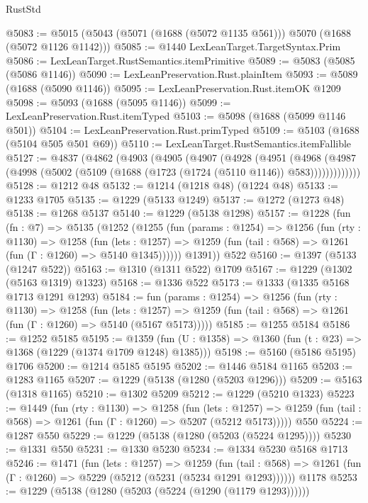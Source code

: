 \begin{lexlean}{RustStd}
\begin{coremodule}
@5083 := @5015 (@5043 (@5071 (@1688 (@5072 @1135 @561))) @5070 (@1688 (@5072 @1126 @1142)))
@5085 := @1440 LexLeanTarget.TargetSyntax.Prim
@5086 := LexLeanTarget.RustSemantics.itemPrimitive
@5089 := @5083 (@5085 (@5086 @1146))
@5090 := LexLeanPreservation.Rust.plainItem
@5093 := @5089 (@1688 (@5090 @1146))
@5095 := LexLeanPreservation.Rust.itemOK @1209
@5098 := @5093 (@1688 (@5095 @1146))
@5099 := LexLeanPreservation.Rust.itemTyped
@5103 := @5098 (@1688 (@5099 @1146 @501))
@5104 := LexLeanPreservation.Rust.primTyped
@5109 := @5103 (@1688 (@5104 @505 @501 @69))
@5110 := LexLeanTarget.RustSemantics.itemFallible
@5127 := @4837
    (@4862
      (@4903
        (@4905
          (@4907
            (@4928
              (@4951
                (@4968
                  (@4987 (@4998 (@5002 (@5109 (@1688 (@1723 (@1724 (@5110 @1146)) @583)))))))))))))
@5128 := @1212 @48
@5132 := @1214 (@1218 @48) (@1224 @48)
@5133 := @1233 @1705
@5135 := @1229 (@5133 @1249)
@5137 := @1272 (@1273 @48)
@5138 := @1268 @5137
@5140 := @1229 (@5138 @1298)
@5157 := @1228
    (fun (fn : @7) =>
    @5135
      (@1252
        (@1255
          (fun (params : @1254) =>
          @1256
            (fun (rty : @1130) =>
            @1258
              (fun (lets : @1257) =>
              @1259 (fun (tail : @568) => @1261 (fun (Γ : @1260) => @5140 @1345))))))
        @1391))
    @522
@5160 := @1397 (@5133 (@1247 @522))
@5163 := @1310 (@1311 @522) @1709
@5167 := @1229 (@1302 (@5163 @1319) @1323)
@5168 := @1336 @522
@5173 := @1333 (@1335 @5168 @1713 @1291 @1293)
@5184 := fun (params : @1254) =>
  @1256
    (fun (rty : @1130) =>
    @1258
      (fun (lets : @1257) =>
      @1259 (fun (tail : @568) => @1261 (fun (Γ : @1260) => @5140 (@5167 @5173)))))
@5185 := @1255 @5184
@5186 := @1252 @5185
@5195 := @1359 (fun (U : @1358) => @1360 (fun (t : @23) => @1368 (@1229 (@1374 @1709 @1248) @1385)))
@5198 := @5160 (@5186 @5195) @1706
@5200 := @1214 @5185 @5195
@5202 := @1446 @5184 @1165
@5203 := @1283 @1165
@5207 := @1229 (@5138 (@1280 (@5203 @1296)))
@5209 := @5163 (@1318 @1165)
@5210 := @1302 @5209
@5212 := @1229 (@5210 @1323)
@5223 := @1449
    (fun (rty : @1130) =>
    @1258
      (fun (lets : @1257) =>
      @1259 (fun (tail : @568) => @1261 (fun (Γ : @1260) => @5207 (@5212 @5173)))))
    @550
@5224 := @1287 @550
@5229 := @1229 (@5138 (@1280 (@5203 (@5224 @1295))))
@5230 := @1331 @550
@5231 := @1330 @5230
@5234 := @1334 @5230 @5168 @1713
@5246 := @1471
    (fun (lets : @1257) =>
    @1259
      (fun (tail : @568) => @1261 (fun (Γ : @1260) => @5229 (@5212 (@5231 (@5234 @1291 @1293))))))
    @1178
@5253 := @1229 (@5138 (@1280 (@5203 (@5224 (@1290 (@1179 @1293))))))

\end{coremodule}
\end{lexlean}
